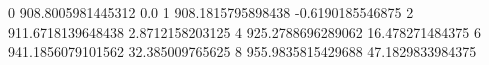 0 908.8005981445312 0.0
1 908.1815795898438 -0.6190185546875
2 911.6718139648438 2.8712158203125
4 925.2788696289062 16.478271484375
6 941.1856079101562 32.385009765625
8 955.9835815429688 47.1829833984375
